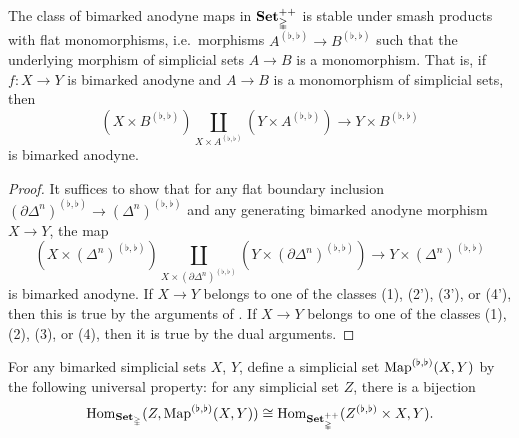 \documentclass[main.tex]{subfiles}
\begin{document}
\begin{lemma}
  \label{lemma:smash_product_of_bimarked_anodyne_and_monic_is_bimarked_anodyne}
  The class of bimarked anodyne maps in $\mathbf{Set}_{\mathbb{\Delta}}^{++}$ is stable under smash products with flat monomorphisms, i.e.\ morphisms $A^{(\flat, \flat)} \to B^{(\flat, \flat)}$ such that the underlying morphism of simplicial sets $A \to B$ is a monomorphism. That is, if $f\colon X \to Y$ is bimarked anodyne and $A \to B$ is a monomorphism of simplicial sets, then
  \begin{equation*}
    (X \times B^{(\flat, \flat)}) \coprod_{X \times A^{(\flat, \flat)}} (Y \times A^{(\flat, \flat)}) \to Y \times B^{(\flat, \flat)}
  \end{equation*}
  is bimarked anodyne.
\end{lemma}
\begin{proof}
  It suffices to show that for any flat boundary inclusion $(\partial \Delta^{n})^{(\flat, \flat)} \to (\Delta^{n})^{(\flat, \flat)}$ and any generating bimarked anodyne morphism $X \to Y$, the map
  \begin{equation*}
    (X \times (\Delta^{n})^{(\flat, \flat)}) \coprod_{X \times (\partial \Delta^{n})^{(\flat, \flat)}} (Y \times (\partial\Delta^{n})^{(\flat, \flat)}) \to Y \times (\Delta^{n})^{(\flat, \flat)}
  \end{equation*}
  is bimarked anodyne. If $X \to Y$ belongs to one of the classes (1), (2'), (3'), or (4'), then this is true by the arguments of \cite[Prop.\ 3.1.2.3]{highertopostheory}. If $X \to Y$ belongs to one of the classes (1), (2), (3), or (4), then it is true by the dual arguments.
\end{proof}

\begin{definition}
  For any bimarked simplicial sets $X$, $Y$, define a simplicial set $\mathrm{Map}^{(\flat, \flat)}(X, Y)$ by the following universal property: for any simplicial set $Z$, there is a bijection
  \begin{equation*}
    \mathrm{Hom}_{\mathbf{Set}_{\mathbb{\Delta}}}(Z, \mathrm{Map}^{(\flat, \flat)}(X, Y)) \cong \mathrm{Hom}_{\mathbf{Set}_{\mathbb{\Delta}}^{++}}(Z^{(\flat, \flat)} \times X, Y).
  \end{equation*}
\end{definition}
\end{document}
